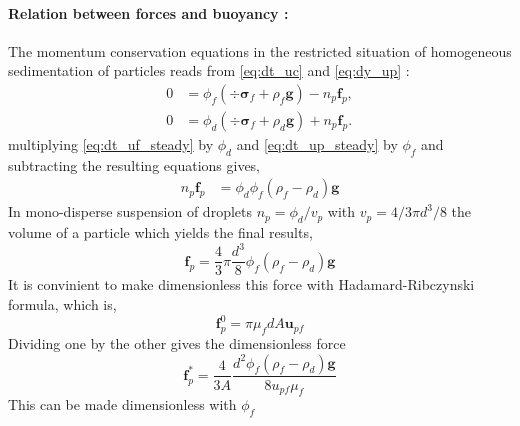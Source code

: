 \paragraph{Relation between forces and buoyancy :} The momentum conservation equations in the restricted situation of homogeneous sedimentation of particles reads from \ref{eq:dt_uc} and \ref{eq:dy_up} :
\begin{align}
    0 
    &= \phi_f 
    \left(\div \bm{\sigma}_f
    + \rho_f \textbf{g}\right)
    - n_p \textbf{f}_p, 
    \label{eq:dt_uf_steady}
    \\
    0
    &= 
    \phi_d \left(\div \bm{\sigma}_f
    + \rho_d \textbf{g}\right)
    + n_p \textbf{f}_p. 
    \label{eq:dt_up_steady}
\end{align}
multiplying \ref{eq:dt_uf_steady} by $\phi_d$ and \ref{eq:dt_up_steady} by $\phi_f$ and subtracting the resulting equations gives, 
\begin{align}
    n_p \textbf{f}_p
    &= 
    \phi_d \phi_f (\rho_f -\rho_d ) \textbf{g}
\end{align}
In  mono-disperse suspension of droplets $n_p = \phi_d / v_p$ with $v_p =4/3\pi d^3/8$ the volume of a particle which yields the final results, 
\begin{equation*}
    \textbf{f}_p
    = 
    \frac{4}{3}\pi\frac{d^3}{8}\phi_f (\rho_f -\rho_d ) \textbf{g}
    \label{eq:drag}
\end{equation*}
It is convinient to make dimensionless this force with Hadamard-Ribczynski formula, which is, 
\begin{equation*}
    \textbf{f}^0_p = \pi \mu_f d A \textbf{u}_{pf}
\end{equation*}
Dividing one by the other gives the dimensionless force
\begin{equation*}
    \textbf{f}^*_p 
    = 
    \frac{4}{3A}\frac{d^2 \phi_f (\rho_f -\rho_d ) \textbf{g}}{8 u_{pf}\mu_f}
\end{equation*}
This can be made dimensionless with $\phi_f$



